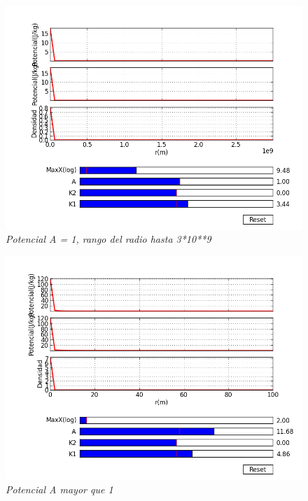 \documentclass[12pt]{book}
\begin{document}
\begin{figure}[!h]
 \centering
 \includegraphics[scale=0.7]{potencial1.png}
 \caption{\emph{Potencial A = 1, rango del radio hasta 3*10**9}}
 \label{Fig: 1}
\end{figure}

\begin{figure}[!h]
 \centering
 \includegraphics[scale=0.7]{potencial3.png}
 \caption{\emph{Potencial A mayor que 1}}
 \label{Fig: 3}
\end{figure}
\end{document}
